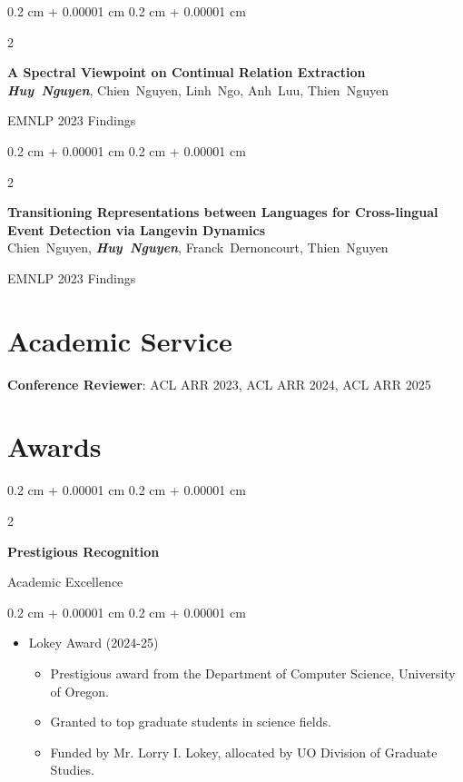 \documentclass[10pt, letterpaper]{article}
\newenvironment{highlights}{
    \begin{itemize}[
        topsep=0.10 cm,
        parsep=0.10 cm,
        partopsep=0pt,
        itemsep=0pt,
        leftmargin=0.4 cm + 10pt
    ]
}{
    \end{itemize}
} %
\newenvironment{onecolentry}{
    \begin{adjustwidth}{
        0.2 cm + 0.00001 cm
    }{
        0.2 cm + 0.00001 cm
    }
}{
    \end{adjustwidth}
} %
\newenvironment{twocolentry}[2][]{
    \onecolentry
    \def\secondColumn{#2}
    \setcolumnwidth{\fill, 4.5 cm}
    \begin{paracol}{2}
}{
    \switchcolumn \raggedleft \secondColumn
    \end{paracol}
    \endonecolentry
} %
\begin{document}
\begin{samepage}
    \vspace{0.10 cm}

    \begin{twocolentry}{EMNLP 2023 Findings}
        \textbf{A Spectral Viewpoint on Continual Relation Extraction} \\
        \mbox{\textbf{\textit{Huy Nguyen}}}, \mbox{Chien Nguyen}, \mbox{Linh Ngo}, \mbox{Anh Luu}, \mbox{Thien Nguyen}
    \end{twocolentry}

    \vspace{0.10 cm}

    \begin{twocolentry}{EMNLP 2023 Findings}
        \textbf{Transitioning Representations between Languages for Cross-lingual Event Detection via Langevin Dynamics} \\
        \mbox{Chien Nguyen}, \mbox{\textbf{\textit{Huy Nguyen}}}, \mbox{Franck Dernoncourt}, \mbox{Thien Nguyen}
    \end{twocolentry}
\end{samepage}

    \section{Academic Service}
    \textbf{Conference Reviewer}: ACL ARR 2023, ACL ARR 2024, ACL ARR 2025

    \section{Awards}

        \begin{twocolentry}{Academic Excellence}
            \textbf{Prestigious Recognition}
        \end{twocolentry}

        \begin{onecolentry}
            \begin{highlights}
                \item Lokey Award (2024-25)
                \begin{itemize}
                    \item Prestigious award from the Department of Computer Science, University of Oregon.
                    \item Granted to top graduate students in science fields.
                    \item Funded by Mr. Lorry I. Lokey, allocated by UO Division of Graduate Studies.
                \end{itemize}
            \end{highlights}
        \end{onecolentry}
\end{document}
